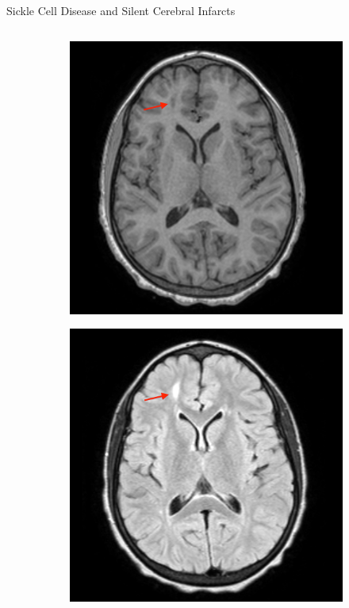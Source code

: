 \documentclass[]{standalone}
\begin{document}
\begin{frame}{Sickle Cell Disease and Silent Cerebral Infarcts}{}
\begin{columns}
		\begin{column}{0.55\textwidth}
			\begin{figure}[h!]
				\begin{subfigure}[b]{0.25\textwidth}
					\includegraphics[scale=0.055]{./IMG/Lesion_T1.png}
				\end{subfigure}
				\hspace{32pt}
				\begin{subfigure}[b]{0.25\textwidth}
					\includegraphics[scale=0.055]{./IMG/Lesion_flair.png}
				\end{subfigure}
				\hspace{20pt}
			\end{figure}
		\end{column}
	\end{columns}
	\end{frame}
\end{document}
